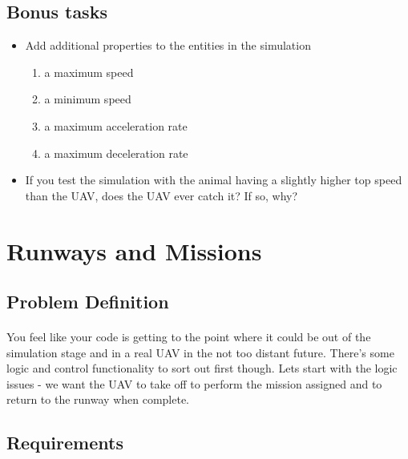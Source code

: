 \documentclass[11pt]{book}
\begin{document}
\subsection{Bonus tasks}

\begin{itemize}
\item Add additional properties to the entities in the simulation
    \begin{enumerate} 
    \item a maximum speed
    \item a minimum speed
    \item a maximum acceleration rate
    \item a maximum deceleration rate
    \end{enumerate}
\item If you test the simulation with the animal having a slightly higher top speed than the UAV, does the UAV ever catch it? If so, why?
\end{itemize}

\clearpage

\section{Runways and Missions}

\subsection{Problem Definition}

\paragraph{} You feel like your code is getting to the point where it could be
out of the simulation stage and in a real UAV in the not too distant future.
There's some logic and control functionality to sort out first though. Lets
start with the logic issues - we want the UAV to take off to perform the
mission assigned and to return to the runway when complete.

\subsection{Requirements}
\end{document}
